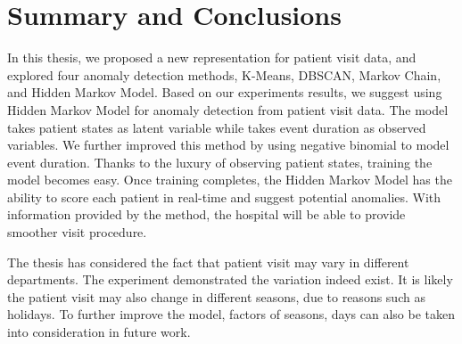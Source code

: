 \chapter{Summary and Conclusions}
\label{chapter:summary}
In this thesis, we proposed a new representation for patient visit data, and explored four anomaly detection methods, K-Means, DBSCAN, Markov Chain, and Hidden Markov Model. Based on our experiments results, we suggest using Hidden Markov Model for anomaly detection from patient visit data. The model takes patient states as latent variable while takes event duration as observed variables. We further improved this method by using negative binomial to model event duration. Thanks to the luxury of observing patient states, training the model becomes easy. Once training completes, the Hidden Markov Model has the ability to score each patient in real-time and suggest potential anomalies. With information provided by the method, the hospital will be able to provide smoother visit procedure.

The thesis has considered the fact that patient visit may vary in different departments. The experiment demonstrated the variation indeed exist. It is likely the patient visit may also change in different seasons, due to reasons such as holidays. To further improve the model, factors of seasons, days can also be taken into consideration in future work. 


